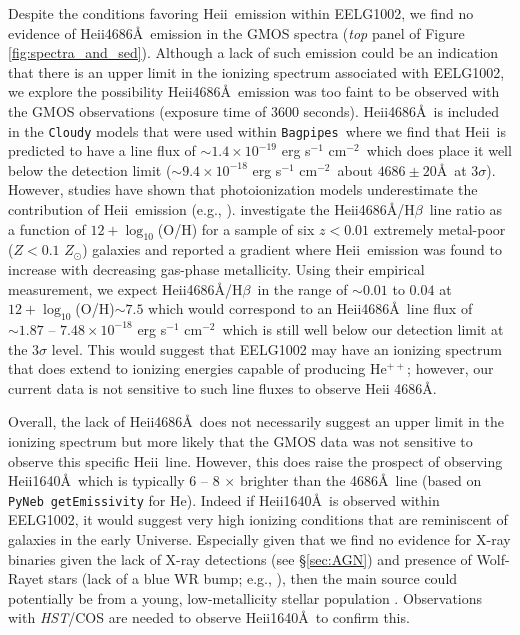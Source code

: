 \documentclass[twocolumn,tight,times,linenumbers]{aastex631}
\newcommand{\hbeta}{H$\beta$}
\newcommand{\heii}{He{\sc ii}}
\newcommand{\cgsline}{erg s$^{-1}$ cm$^{-2}$}
\newcommand{\zsol}{$Z_\odot$}
\newcommand{\pyneb}{\texttt{PyNeb}}
\newcommand{\bagpipes}{\texttt{Bagpipes}}
\begin{document}
		Despite the conditions favoring \heii~emission within EELG1002, we find no evidence of \heii4686\AA~emission in the GMOS spectra (\textit{top} panel of Figure \ref{fig:spectra_and_sed}). Although a lack of such emission could be an indication that there is an upper limit in the ionizing spectrum associated with EELG1002, we explore the possibility \heii4686\AA~emission was too faint to be observed with the GMOS observations (exposure time of 3600 seconds). \heii4686\AA~is included in the \texttt{Cloudy} models that were used within \bagpipes~where we find that \heii~is predicted to have a line flux of $\sim 1.4\times10^{-19}$ \cgsline~which does place it well below the detection limit ($\sim9.4\times10^{-18}$ \cgsline~about $4686\pm20$\AA~at $3\sigma$). However, studies have shown that photoionization models underestimate the contribution of \heii~emission (e.g., \citealt{Nanayakkara2019,Berg2021}). \cite{Senchyna2019} investigate the \heii4686\AA/\hbeta~line ratio as a function of $12+\log_{10}$(O/H) for a sample of six $z < 0.01$ extremely metal-poor ($Z < 0.1$ \zsol) galaxies and reported a gradient where \heii~emission was found to increase with decreasing gas-phase metallicity. Using their empirical measurement, we expect \heii4686\AA/\hbeta~in the range of $\sim 0.01$ to $0.04$ at $12+\log_{10}$(O/H)$\sim 7.5$ which would correspond to an \heii4686\AA~line flux of $\sim 1.87$ -- $7.48 \times 10^{-18}$ \cgsline~which is still well below our detection limit at the $3\sigma$ level. This would suggest that EELG1002 may have an ionizing spectrum that does extend to ionizing energies capable of producing He$^{++}$; however, our current data is not sensitive to such line fluxes to observe He{\sc ii} 4686\AA. 

		Overall, the lack of He{\sc ii}4686\AA~does not necessarily suggest an upper limit in the ionizing spectrum but more likely that the GMOS data was not sensitive to observe this specific \heii~line. However, this does raise the prospect of observing \heii1640\AA~which is typically 6 -- 8 $\times$ brighter than the 4686\AA~line (based on \pyneb~\texttt{getEmissivity} for He). Indeed if He{\sc ii}1640\AA~is observed within EELG1002, it would suggest very high ionizing conditions that are reminiscent of galaxies in the early Universe. Especially given that we find no evidence for X-ray binaries given the lack of X-ray detections (see \S\ref{sec:AGN}) and presence of Wolf-Rayet stars (lack of a blue WR bump; e.g., \citealt{Guseva2000}), then the main source could potentially be from a young, low-metallicity stellar population \citep{Saxena2020}. Observations with \textit{HST}/COS are needed to observe He{\sc ii}1640\AA~to confirm this.
		
\end{document}
